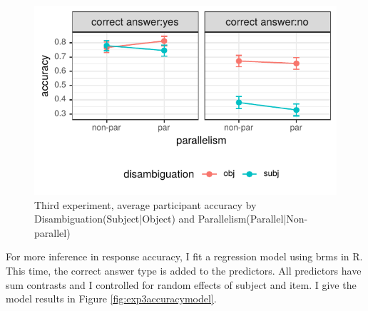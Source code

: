 \begin{knitrout}
\color{fgcolor}\begin{figure}[hbt!]

{\centering \includegraphics[]{experiments/equivalance/report/figure/exp3accuracy-1.pdf} 

}

\caption[Third experiment, average participant accuracy by Disambiguation(Subject|Object) and Parallelism(Parallel|Non-parallel)]{Third experiment, average participant accuracy by Disambiguation(Subject|Object) and Parallelism(Parallel|Non-parallel)}\label{fig:exp3accuracy}
\end{figure}


\end{knitrout}

For more inference in response accuracy, I fit a regression model using brms in R. This time, the correct answer type is added to the predictors. All predictors have sum contrasts and I controlled for random effects of subject and item. I give the model results in Figure \ref{fig:exp3accuracymodel}.

